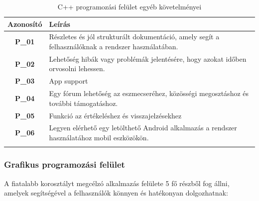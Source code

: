 \documentclass{article}
\begin{document}
\begingroup
\centering
\begin{longtable}{|c|p{14cm}|}
\hline
\textbf{Azonosító} & \textbf{Leírás}        \\ 
\hline
       \textbf{P\_01}  &  Részletes és jól strukturált dokumentáció, amely segít a felhasználóknak a rendszer használatában. \\\hline
       \textbf{P\_02}  &  Lehetőség hibák vagy problémák jelentésére, hogy azokat időben orvosolni lehessen. \\\hline
       \textbf{P\_03}  &  App support \\\hline
       \textbf{P\_04}  &  Egy fórum lehetőség az eszmecseréhez, közösségi megosztáshoz és további támogatáshoz. \\\hline
       \textbf{P\_05}  &  Funkció az értékeléshez és visszajelzésekhez  \\\hline
       \textbf{P\_06}  &  Legyen elérhető egy letölthető Android alkalmazás a rendszer használatához mobil eszközökön. \\\hline
\hline
\caption{C++ programozási felület egyéb követelményei}
\end{longtable}
\endgroup


\subsubsection{Grafikus programozási felület}

A fiatalabb korosztályt megcélzó alkalmazás felülete 5 fő részből fog állni, amelyek segítségével a felhasználók könnyen és hatékonyan dolgozhatnak:
\end{document}
